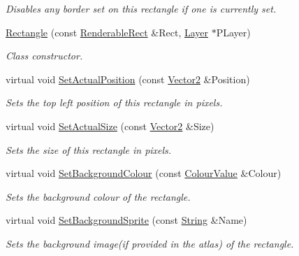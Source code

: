 \begin{DoxyCompactItemize}
\begin{DoxyCompactList}\small\item\em Disables any border set on this rectangle if one is currently set. \item\end{DoxyCompactList}\item 
\hyperlink{classphys_1_1UI_1_1Rectangle_a6e6e88eb63cc8131da9c8de0fb691801}{Rectangle} (const \hyperlink{structphys_1_1UI_1_1RenderableRect}{RenderableRect} \&Rect, \hyperlink{classphys_1_1UI_1_1Layer}{Layer} $\ast$PLayer)
\begin{DoxyCompactList}\small\item\em Class constructor. \item\end{DoxyCompactList}\item 
virtual void \hyperlink{classphys_1_1UI_1_1Rectangle_a8a5af1cc3360196f793deb8a0db604e4}{SetActualPosition} (const \hyperlink{classphys_1_1Vector2}{Vector2} \&Position)
\begin{DoxyCompactList}\small\item\em Sets the top left position of this rectangle in pixels. \item\end{DoxyCompactList}\item 
virtual void \hyperlink{classphys_1_1UI_1_1Rectangle_ab2afb04d539b2b1fc384fa1050b1ba21}{SetActualSize} (const \hyperlink{classphys_1_1Vector2}{Vector2} \&Size)
\begin{DoxyCompactList}\small\item\em Sets the size of this rectangle in pixels. \item\end{DoxyCompactList}\item 
virtual void \hyperlink{classphys_1_1UI_1_1Rectangle_a687b524b89e6a76bc102b60023d36abd}{SetBackgroundColour} (const \hyperlink{classphys_1_1ColourValue}{ColourValue} \&Colour)
\begin{DoxyCompactList}\small\item\em Sets the background colour of the rectangle. \item\end{DoxyCompactList}\item 
virtual void \hyperlink{classphys_1_1UI_1_1Rectangle_ae9cc47125e075aaa9bfd397762de6e0c}{SetBackgroundSprite} (const \hyperlink{namespacephys_aa03900411993de7fbfec4789bc1d392e}{String} \&Name)
\begin{DoxyCompactList}\small\item\em Sets the background image(if provided in the atlas) of the rectangle. \item\end{DoxyCompactList}\item 

\end{DoxyCompactItemize}
